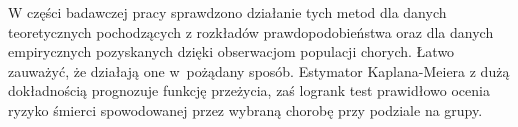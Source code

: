\documentclass[licencjacka]{pwr_wmat_praca_dyplomowa}
\theoremstyle{plain}
\numberwithin{theorem}{chapter}
\theoremstyle{definition}
\numberwithin{theorem}{chapter}
\begin{document}
W części badawczej pracy sprawdzono działanie tych metod dla danych teoretycznych pochodzących z rozkładów prawdopodobieństwa oraz dla danych empirycznych pozyskanych dzięki obserwacjom populacji chorych. Łatwo zauważyć, że działają one w~pożądany sposób. Estymator Kaplana-Meiera z dużą dokładnością prognozuje funkcję przeżycia, zaś logrank test prawidłowo ocenia ryzyko śmierci spowodowanej przez wybraną chorobę przy podziale na grupy. 






\newpage
\end{document}
